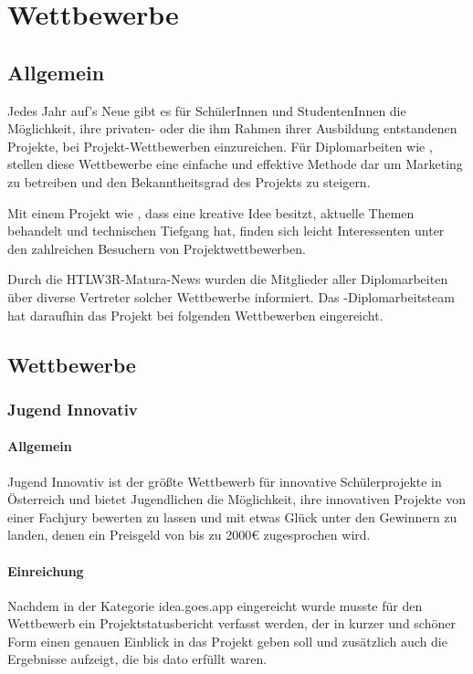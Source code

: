 \chapter{Wettbewerbe}
\renewcommand{\kapitelautor}{Autor: Andreas Novak}

\section{Allgemein}
Jedes Jahr auf's Neue gibt es für SchülerInnen und StudentenInnen die Möglichkeit, ihre privaten-
oder die ihm Rahmen ihrer Ausbildung entstandenen Projekte, bei Projekt-Wettbewerben
einzureichen. Für Diplomarbeiten wie \sblit, stellen diese Wettbewerbe eine einfache und effektive
Methode dar um Marketing zu betreiben und den Bekanntheitsgrad des Projekts zu steigern.

Mit einem Projekt wie \sblit, dass eine kreative Idee besitzt, aktuelle Themen behandelt und technischen Tiefgang hat,
finden sich leicht Interessenten unter den zahlreichen Besuchern von Projektwettbewerben.

Durch die HTLW3R-Matura-News wurden die Mitglieder aller Diplomarbeiten über diverse Vertreter
solcher Wettbewerbe informiert. Das \sblit-Diplomarbeitsteam hat daraufhin das Projekt bei folgenden
Wettbewerben eingereicht.

\section{Wettbewerbe}
\subsection{Jugend Innovativ}
\subsubsection{Allgemein}
Jugend Innovativ ist der größte Wettbewerb für innovative Schülerprojekte in Österreich und
bietet Jugendlichen die Möglichkeit, ihre innovativen Projekte von einer Fachjury bewerten zu lassen
und mit etwas Glück unter den Gewinnern zu landen, denen ein Preisgeld von bis zu 2000€ zugesprochen wird.

\subsubsection{Einreichung}
Nachdem \sblit in der Kategorie idea.goes.app eingereicht  wurde musste für den Wettbewerb ein Projektstatusbericht verfasst werden, der in kurzer und schöner Form einen
genauen Einblick in das Projekt geben soll und zusätzlich auch die Ergebnisse aufzeigt, die bis dato erfüllt waren.

